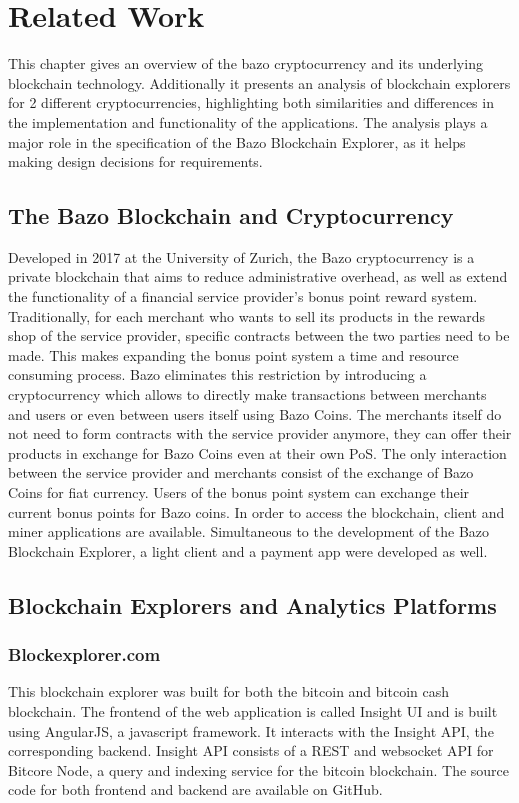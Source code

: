 \chapter{Related Work}
This chapter gives an overview of the bazo cryptocurrency and its underlying blockchain technology. Additionally it presents an analysis of blockchain explorers for 2 different cryptocurrencies, highlighting both similarities and differences in the implementation and functionality of the applications. The analysis plays a major role in the specification of the Bazo Blockchain Explorer, as it helps making design decisions for requirements.

\section{The Bazo Blockchain and Cryptocurrency}
Developed in 2017 at the University of Zurich, the Bazo cryptocurrency is a private blockchain that aims to reduce administrative overhead, as well as extend the functionality of a financial service provider's bonus point reward system. Traditionally, for each merchant who wants to sell its products in the rewards shop of the service provider, specific contracts between the two parties need to be made. This makes expanding the bonus point system a time and resource consuming process. Bazo eliminates this restriction by introducing a cryptocurrency which allows to directly make transactions between merchants and users or even between users itself using Bazo Coins. The merchants itself do not need to form contracts with the service provider anymore, they can offer their products in exchange for Bazo Coins even at their own PoS. The only interaction between the service provider and merchants consist of the exchange of Bazo Coins for fiat currency. Users of the bonus point system can exchange their current bonus points for Bazo coins. In order to access the blockchain, client and miner applications are available. Simultaneous to the development of the Bazo Blockchain Explorer, a light client and a payment app were developed as well.

\section{Blockchain Explorers and Analytics Platforms}
\subsection{Blockexplorer.com}
This blockchain explorer was built for both the bitcoin and bitcoin cash blockchain. The frontend of the web application is called Insight UI and is built using AngularJS, a javascript framework. It interacts with the Insight API, the corresponding backend. Insight API consists of a REST and websocket API for Bitcore Node, a query and indexing service for the bitcoin blockchain. The source code for both frontend and backend are available on GitHub.

